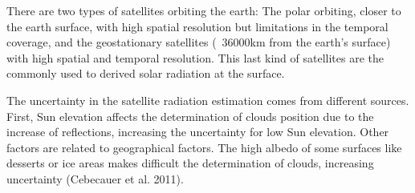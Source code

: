 There are two types of satellites orbiting the earth: The polar orbiting, closer to the earth surface,  with high spatial resolution but limitations in the temporal coverage, and the geostationary satellites (~36000km from the earth's surface) with high spatial and temporal resolution. This last kind of satellites are the commonly used to derived solar radiation at the surface.

The uncertainty in the satellite radiation estimation comes from different sources. First, Sun elevation affects the determination of clouds position due to the increase of reflections, increasing  the uncertainty for low Sun elevation. Other factors are related to geographical factors. The high albedo of some surfaces like desserts or ice areas makes difficult the determination of clouds, increasing uncertainty (Cebecauer et al. 2011).






